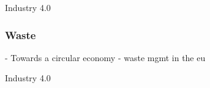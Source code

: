 {Industry 4.0}



\subsubsection{Waste}
\parencite{OakdeneHollins2017} - Towards a circular economy - waste mgmt in the eu

{Industry 4.0}
\parencite{Vafeiadis2019}








